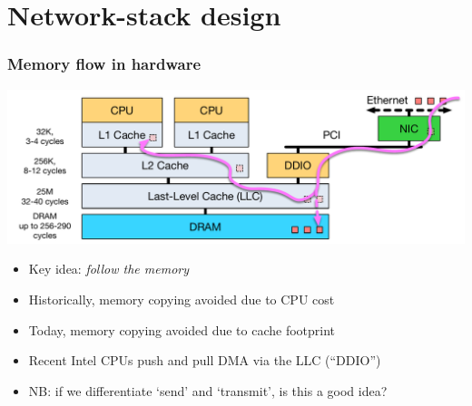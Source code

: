 \section{Network-stack design}

\begin{frame}
  \frametitle{Memory flow in hardware}

  \begin{center}
  \includegraphics[scale=0.5]{../../figures/network-cpu-ddio-nic.pdf}
  \end{center}

  \medskip
  \pause

  \begin{itemize}
    \item Key idea: \textit{follow the memory}

    \medskip
    \pause

    \item Historically, memory copying avoided due to CPU cost
    \item Today, memory copying avoided due to cache footprint

    \medskip
    \pause

    \item Recent Intel CPUs push and pull DMA via the LLC (``DDIO'')
    \item NB: if we differentiate `send' and `transmit', is this a good idea?
  \end{itemize}
\end{frame}

